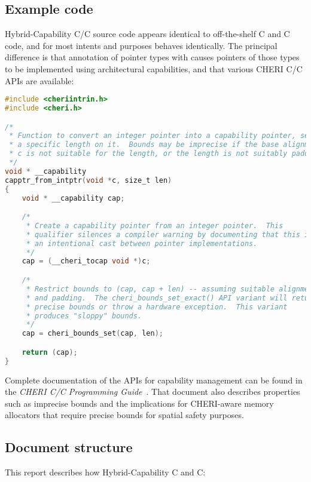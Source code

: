 \documentclass[12pt,twoside,openright,a4paper]{article}
\newcommand{\ccode}[1]{{\small\ttfamily{#1}}}
\newcommand{\uucap}{{\ccode{\_\_capability}}\xspace}
\newcommand*{\cpp}{\texorpdfstring{C\textsmaller[2]{\protect\nolinebreak[4]\hspace{-.05em}\raisebox{.45ex}{\textbf{++}}}}{C++}}
\newcommand*{\COrCpp}{C/\cpp{}}
\newcommand*{\purecapCOrCpp}{CHERI \COrCpp{}}
\newcommand*{\hybridCOrCpp}{Hybrid-Capability \COrCpp{}}
\newcommand*{\CAndCpp}{C and \cpp{}}
\newcommand*{\hybridCAndCpp}{Hybrid-Capability \CAndCpp{}}
\begin{document}
\subsection{Example code}

\hybridCOrCpp{} source code appears identical to off-the-shelf C and \cpp{}
code, and for most intents and purposes behaves identically.
The principal difference is that annotation of pointer types with \uucap{}
causes pointers of those types to be implemented using architectural
capabilities, and that various \purecapCOrCpp{} APIs are available:

\begin{lstlisting}[language=C]
#include <cheriintrin.h>
#include <cheri.h>

/*
 * Function to convert an integer pointer into a capability pointer, setting
 * a specific length on it.  Bounds may be imprecise if the base alignment of
 * c is not suitable for the length, or the length is not suitably padded.
 */
void * __capability
capptr_from_intptr(void *c, size_t len)
{
	void * __capability cap;

	/*
	 * Create a capability pointer from an integer pointer.  This
	 * qualifier silences a compiler warning by documenting that this is
	 * an intentional cast between pointer implementations.
	 */
	cap = (__cheri_tocap void *)c;

	/*
	 * Restrict bounds to (cap, cap + len) -- assuming suitable alignment
	 * and padding.  The cheri_bounds_set_exact() API variant will return
	 * precise bounds or throw a hardware exception.  This variant
	 * produces "sloppy" bounds.
	 */
	cap = cheri_bounds_set(cap, len);

	return (cap);
}
\end{lstlisting}

\noindent
Complete documentation of the APIs for capability management can be found in
the \textit{\purecapCOrCpp{} Programming Guide}~\cite{UCAM-CL-TR-947}.
That document also describes properties such as imprecise bounds and the
implications for CHERI-aware memory allocators that require precise bounds for
spatial safety purposes.

\subsection{Document structure}

This report describes how \hybridCAndCpp{}:
\end{document}
